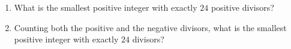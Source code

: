 \begin{enumerate}
\item[(a)] What is the smallest positive integer with exactly $24$ positive divisors?
\item[(b)] Counting both the positive and the negative divisors, what is the smallest positive integer with exactly $24$ divisors?
\end{enumerate}
